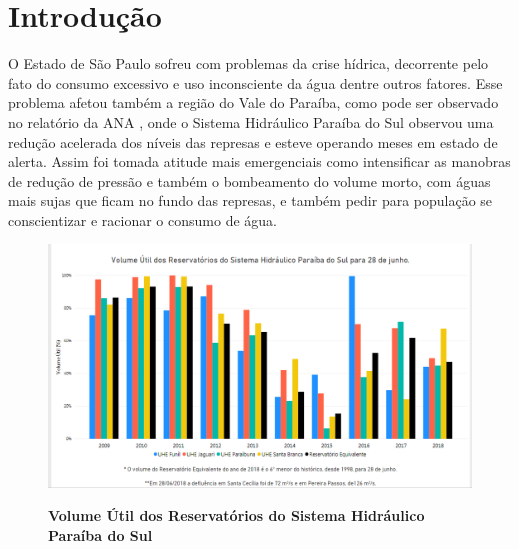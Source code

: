 \chapter[Introdução]{Introdução}
\par O Estado de São Paulo sofreu com problemas da crise hídrica, decorrente pelo fato do consumo excessivo e uso inconsciente da água  dentre outros fatores. Esse problema afetou também a região do Vale do Paraíba, como pode ser observado no relatório da ANA \cite{ana1}, onde o Sistema Hidráulico Paraíba do Sul observou uma redução acelerada dos níveis das represas e esteve operando meses em estado de alerta. Assim foi tomada atitude mais emergenciais como intensificar as manobras de redução de pressão e também o bombeamento do volume morto, com águas mais sujas que ficam no fundo das represas, e também pedir para população se conscientizar e racionar o consumo de água.

 
\begin{figure}[h]
	\caption{\textbf{Volume Útil dos Reservatórios do Sistema Hidráulico Paraíba do Sul}}
	\centering
\includegraphics[width=\textwidth,height=\textheight ,keepaspectratio]{figuras/situacaoreservatoriosvaleparaiba}
    \label{fig:ana}	
\end{figure}



